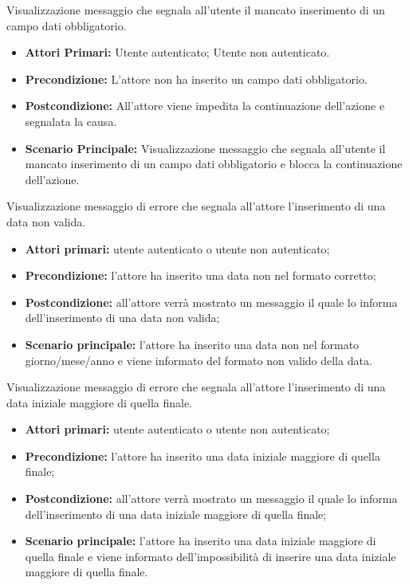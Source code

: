 Visualizzazione messaggio che segnala all'utente il mancato inserimento di un campo dati obbligatorio.
\begin{itemize}
    \item \textbf{Attori Primari:} Utente autenticato; Utente non autenticato.
    \item \textbf{Precondizione:} L'attore non ha inserito un campo dati obbligatorio.
    \item \textbf{Postcondizione:} All'attore viene impedita la continuazione dell'azione e segnalata la causa.
    \item \textbf{Scenario Principale:} Visualizzazione messaggio che segnala all'utente il mancato inserimento di un campo dati obbligatorio e blocca la continuazione dell'azione.
\end{itemize}

Visualizzazione messaggio di errore che segnala all'attore l'inserimento di una data non valida.
\begin{itemize}
    \item \textbf{Attori primari:} utente autenticato o utente non autenticato;
    \item \textbf{Precondizione:} l'attore ha inserito una data non nel formato corretto;
    \item \textbf{Postcondizione:} all'attore verrà mostrato un messaggio il quale lo informa dell'inserimento di una data non valida;
    \item \textbf{Scenario principale:} l'attore ha inserito una data non nel formato giorno/mese/anno e viene informato del formato non valido della data.
\end{itemize}

Visualizzazione messaggio di errore che segnala all'attore l'inserimento di una data iniziale maggiore di quella finale.
\begin{itemize}
    \item \textbf{Attori primari:} utente autenticato o utente non autenticato;
    \item \textbf{Precondizione:} l'attore ha inserito una data iniziale maggiore di quella finale;
    \item \textbf{Postcondizione:} all'attore verrà mostrato un messaggio il quale lo informa dell'inserimento di una data iniziale maggiore di quella finale;
    \item \textbf{Scenario principale:} l'attore ha inserito una data iniziale maggiore di quella finale e viene informato dell'impossibilità di inserire una data iniziale maggiore di quella finale.
\end{itemize}


